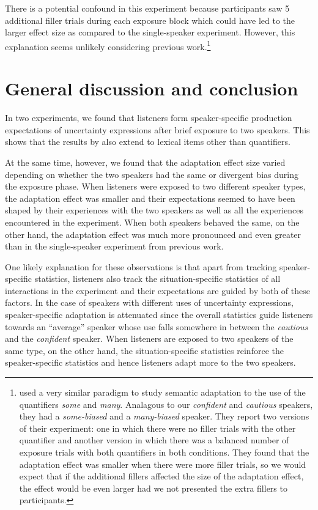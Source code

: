 \documentclass[10pt,letterpaper]{article}
\begin{document}
There is a potential confound in this experiment because participants saw 5 additional filler trials during each exposure block which could have led to the larger effect size as compared
to the single-speaker experiment. However, this explanation seems unlikely considering previous work.\footnote{ used 
a very similar paradigm to study semantic adaptation to the use of the quantifiers \textit{some} and \textit{many}. Analagous to our \textit{confident} and 
\textit{cautious} speakers, they had a \textit{some-biased} and a \textit{many-biased} speaker. They report two versions of their experiment: one in which
there were no filler trials with the other quantifier and another version in which there was a balanced number of exposure trials with both quantifiers in both conditions. They found that the adaptation effect was smaller when there were more filler trials, so we would expect that if the additional fillers affected the size of the adaptation effect, the effect would be even larger had we not presented the extra fillers to participants.}


\section{General discussion and conclusion}

In two experiments, we found that listeners form speaker-specific production expectations of 
uncertainty expressions after brief exposure to two speakers. This shows that the results
by  also extend to lexical items other than quantifiers. 

At the same time, however, we found that the adaptation effect size varied depending on 
whether the two speakers had the same or divergent bias during the exposure phase.
When listeners were exposed to two different speaker types, the adaptation effect was smaller
and their expectations seemed to have been shaped by their experiences with the two speakers as well as all the experiences encountered in the experiment.
When both speakers behaved the same, on the other hand, the adaptation effect was much 
more pronounced and even greater than in the single-speaker experiment from previous work.

One likely explanation for these observations is that apart from tracking speaker-specific statistics,
listeners also track the situation-specific statistics of all interactions in the experiment and their expectations
are guided by both of these factors. In the case of speakers with different uses of uncertainty expressions,
speaker-specific adaptation is attenuated since the overall statistics guide listeners towards an ``average''
speaker whose use falls somewhere in between the \textit{cautious} and the \textit{confident} speaker. When listeners
are exposed to two speakers of the same type, on the other hand, the situation-specific statistics reinforce
the speaker-specific statistics and hence listeners adapt more to the two speakers. 
\end{document}
